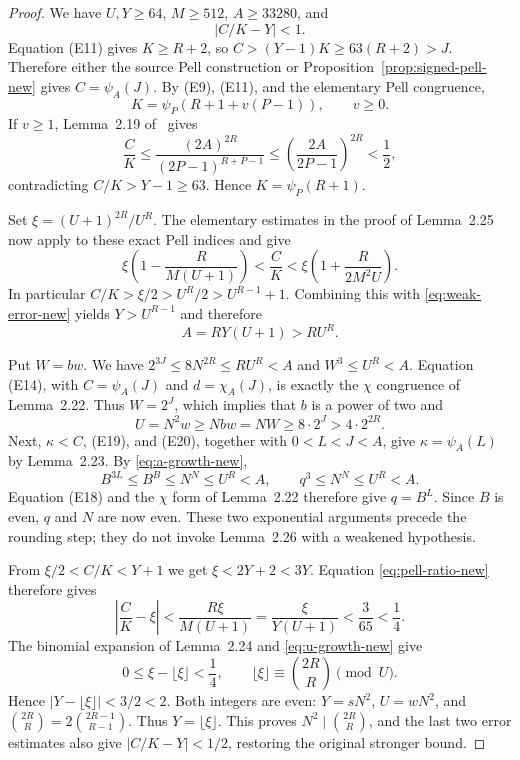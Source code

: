 \begin{proof}
We have $U,Y\ge64$, $M\ge512$, $A\ge33280$, and
\begin{equation}\label{eq:weak-error-new}
 |C/K-Y|<1.
\end{equation}
Equation (E11) gives $K\ge R+2$, so
$C>(Y-1)K\ge63(R+2)>J$. Therefore either the source Pell construction
or Proposition~\ref{prop:signed-pell-new} gives $C=\psi_A(J)$.
By (E9), (E11), and the elementary Pell congruence,
\[
 K=\psi_P(R+1+v(P-1)),\qquad v\ge0.
\]
If $v\ge1$, Lemma~2.19 of~\cite{J82} gives
\[
 \frac CK\le
 \frac{(2A)^{2R}}{(2P-1)^{R+P-1}}
 \le\left(\frac{2A}{2P-1}\right)^{2R}<\frac12,
\]
contradicting $C/K>Y-1\ge63$. Hence $K=\psi_P(R+1)$.

Set $\xi=(U+1)^{2R}/U^R$. The elementary estimates in the proof of
Lemma~2.25 now apply to these exact Pell indices and give
\begin{equation}\label{eq:pell-ratio-new}
 \xi\left(1-\frac{R}{M(U+1)}\right)<\frac CK
 <\xi\left(1+\frac{R}{2M^2U}\right).
\end{equation}
In particular
$C/K>\xi/2>U^R/2>U^{R-1}+1$. Combining this with
\eqref{eq:weak-error-new} yields $Y>U^{R-1}$ and therefore
\begin{equation}\label{eq:a-growth-new}
 A=RY(U+1)>RU^R.
\end{equation}

Put $W=bw$. We have
$2^{3J}\le8N^{2R}\le RU^R<A$ and $W^3\le U^R<A$.
Equation (E14), with $C=\psi_A(J)$ and $d=\chi_A(J)$, is exactly the
$\chi$ congruence of Lemma~2.22. Thus $W=2^J$, which implies that
$b$ is a power of two and
\begin{equation}\label{eq:u-growth-new}
 U=N^2w\ge Nbw=NW\ge8\cdot2^J>4\cdot2^{2R}.
\end{equation}
Next, $\kappa<C$, (E19), and (E20), together with $0<L<J<A$, give
$\kappa=\psi_A(L)$ by Lemma~2.23. By \eqref{eq:a-growth-new},
\[
 B^{3L}\le B^B\le N^N\le U^R<A,
 \qquad q^3\le N^N\le U^R<A.
\]
Equation (E18) and the $\chi$ form of Lemma~2.22 therefore give $q=B^L$.
Since $B$ is even, $q$ and $N$ are now even. These two exponential
arguments precede the rounding step; they do not invoke Lemma~2.26
with a weakened hypothesis.

From $\xi/2<C/K<Y+1$ we get $\xi<2Y+2<3Y$. Equation
\eqref{eq:pell-ratio-new} therefore gives
\[
 \left|\frac CK-\xi\right|
 <\frac{R\xi}{M(U+1)}
 =\frac{\xi}{Y(U+1)}<\frac3{65}<\frac14.
\]
The binomial expansion of Lemma~2.24 and \eqref{eq:u-growth-new} give
\[
 0\le\xi-\lfloor\xi\rfloor<\frac14,
 \qquad \lfloor\xi\rfloor\equiv\binom{2R}{R}\pmod U.
\]
Hence $|Y-\lfloor\xi\rfloor|<3/2<2$. Both integers are even:
$Y=sN^2$, $U=wN^2$, and
$\binom{2R}{R}=2\binom{2R-1}{R-1}$. Thus $Y=\lfloor\xi\rfloor$.
This proves $N^2\mid\binom{2R}{R}$, and the last two error estimates
also give $|C/K-Y|<1/2$, restoring the original stronger bound.
\end{proof}

